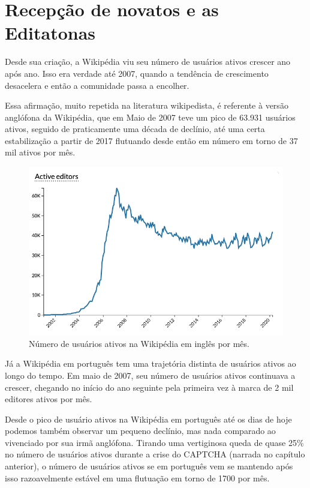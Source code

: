 \section{Recepção de novatos e as Editatonas}

Desde sua criação, a Wikipédia viu seu número de usuários ativos crescer ano após ano. Isso era verdade até 2007, quando a tendência de crescimento desacelera e então a comunidade passa a encolher.  \citep{halfaker_rise_2013}

Essa afirmação, muito repetida na literatura wikipedista, é referente à versão anglófona da Wikipédia, que em Maio de 2007 teve um pico de 63.931 usuários ativos, seguido de praticamente uma década de declínio, até uma certa estabilização a partir de 2017 flutuando desde então em número em torno de 37 mil ativos por mês. \citep{wikimedia_stats_active_editors_enwiki_2020}

\begin{figure}[hbt]
    \centering
    \includegraphics[width=1\textwidth]{Images/active_editors_enwiki.png}
    \caption{Número de usuários ativos na Wikipédia em inglês por mês. \citep{wikimedia_stats_active_editors_enwiki_2020} }
    \label{fig:active_editors_enwiki}
\end{figure}

Já a Wikipédia em português tem uma trajetória distinta de usuários ativos ao longo do tempo. Em maio de 2007, seu número de usuários ativos continuava a crescer, chegando no início do ano seguinte pela primeira vez à marca de 2 mil editores ativos por mês. \citep{wikimedia_stats_active_editors_ptwiki_2020}

Desde o pico de usuário ativos na Wikipédia em português até os dias de hoje podemos também observar um pequeno declínio, mas nada comparado ao vivenciado por sua irmã anglófona. Tirando uma vertiginosa queda de quase 25\% no número de usuários ativos durante a crise do CAPTCHA (narrada no capítulo anterior), o número de usuários ativos se em português vem se mantendo após isso razoavelmente estável em uma flutuação em torno de 1700 por mês.

